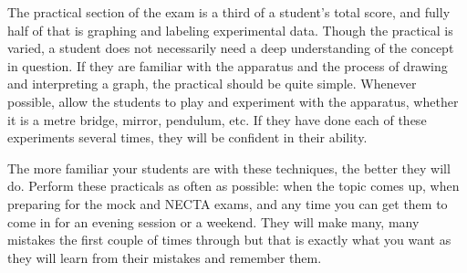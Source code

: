 The practical section of the exam is a third of a student’s total score, and fully half
of that is graphing and labeling experimental data. 
Though the practical is varied, a student does not necessarily need a deep
understanding of the concept in question. If they are familiar with the apparatus and the
process of drawing and interpreting a graph, the practical should be quite simple.
Whenever possible, allow the students to play and experiment with the apparatus,
whether it is a metre bridge, mirror, pendulum, etc. If they have done each of these experiments several times, they will be confident in their ability.

The more familiar your students are with these techniques, the better they will do.
Perform these practicals as often as possible: when the topic comes up, when preparing
for the mock and NECTA exams, and any time you can get them to come in for an
evening session or a weekend. They will make many, many mistakes the first couple of
times through but that is exactly what you want as they will learn from their mistakes and
remember them.


